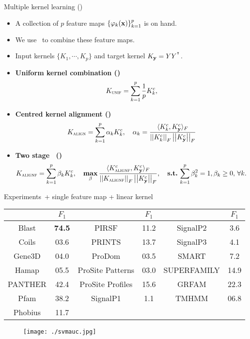 \documentclass[first=dgreen,second=purple,logo=yellowexc]{aaltoslides}
\begin{document}
\begin{frame}{Multiple kernel learning (\mkl)}
	\begin{itemize}
		\item A collection of $p$ feature maps $\{\varphi_k(\mathbf {x})\}_{k=1}^p$ is on hand.
		\item We use \mkl\ to combine these feature maps.\\
		\item Input kernels $\{K_1,\cdots,K_p\}$ and target kernel $K_{\mathbf {y}} = YY^{^{\intercal}}$.
		\item {\bf Uniform kernel combination (\kunif)}
		\begin{align*}
		    K_{\text{{\sc unif}}}=\sum_{k=1}^{p}\frac{1}{p}K^c_k,
		\end{align*}
		\item {\bf Centred kernel alignment (\kalign)}
		\begin{align*}
			K_{\text{{\sc align}}}=\sum_{k=1}^{p}\alpha_kK^c_k,\quad \alpha_k = \frac{\langle K^c_k, K^{c}_{\mathbf {y}} \rangle_{F}}{\left|\left| K^c_k \right|\right|_F\left|\left| K_{\mathbf {y}}^{c} \right|\right|_F} 
		\end{align*}
		\item {\bf Two stage \mkl\ (\kalignf)}
		\begin{align*}
			K_{\text{{\sc alignf}}}=\sum_{k=1}^{p}\beta_k K^c_k, \quad
			\underset{\beta}{\textbf{max}}\, & \displaystyle \frac{\langle K_{\text{{\sc alignf}}}^c, K_{\mathbf {y}}^c \rangle_F}{\left|\left| K_{\text{{\sc alignf}}} \right|\right|_F\left|\left| K_{\mathbf {y}}^c \right|\right|_F},
		    \quad \textbf{s.t.}\,  \displaystyle \sum_{k=1}^p\beta_k^2=1,  \beta_k\ge0,\,\forall k.
		\end{align*}
	\end{itemize}
\end{frame}

\begin{frame}[allowframebreaks]{Experiments}{\svm\ + single feature map + linear kernel}
	{\scriptsize
	\begin{tabular}{|c|c||c|c||c|c|}\hline
		    &   $F_1$		& 		        & $F_1$        &           & $F_1$        \\ \hline
	Blast   &	{\bf 74.5}	& PIRSF	            & 11.2	& SignalP2	    & 3.6    \\
	Coils   &	03.6	& PRINTS	        & 13.7	& SignalP3	    & 4.1    \\
	Gene3D  &	04.0	& ProDom	        & 03.5	& SMART	        & 7.2    \\
	Hamap   &	05.5	& ProSite Patterns	& 03.0	& SUPERFAMILY	& 14.9    \\
	PANTHER &	42.4	& ProSite Profiles	& 15.6	& GRFAM	        & 22.3    \\
	Pfam	&   38.2	& SignalP1	        & 1.1	& TMHMM	        & 06.8    \\
	Phobius	&   11.7	&                   &       &               & \\\hline			
	\end{tabular}}
	\framebreak
	\begin{figure}
		\texttt{[image: ./svmauc.jpg]}
	\end{figure}
\end{frame}
\end{document}
